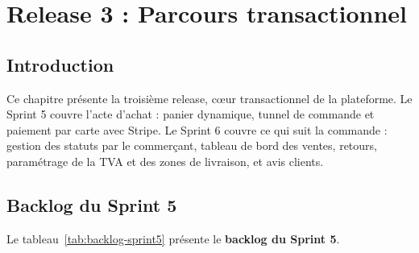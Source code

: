\thispagestyle{fancy}
\chapter{Release 3 : Parcours transactionnel}
\section*{Introduction}
Ce chapitre présente la troisième release, cœur transactionnel de la plateforme. Le Sprint 5 couvre l'acte d'achat : panier dynamique, tunnel de commande et paiement par carte avec Stripe. Le Sprint 6 couvre ce qui suit la commande : gestion des statuts par le commerçant, tableau de bord des ventes, retours, paramétrage de la TVA et des zones de livraison, et avis clients.

\section{Backlog du Sprint 5}
Le tableau~\ref{tab:backlog-sprint5} présente le \textbf{backlog du Sprint 5}.

